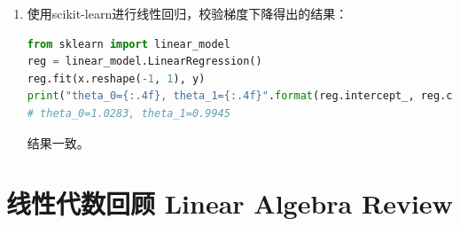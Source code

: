 \documentclass[12pt, a4paper]{article}
\begin{document}
\begin{enumerate}
\begin{align*}
\begin{matrix}
                           \vdots \\
                           y^m
                       \end{matrix}
                   \right]\right)
               \end{align*}
               即：
               \begin{align*}
                   \theta_j&:=\theta_j-\frac{\alpha}{m}\sum_{i=1}^{m}(\theta_0x_0^i+\theta_1x_1^i+\dots-y^i)\cdot x_j^i \\
                   \Rightarrow\Theta&:=\Theta-\frac{\alpha}{m}X^T(X\times \Theta^T-Y)
               \end{align*}
               当只有两个参数$\theta_0,\theta_1$时，由于$\theta_0$对应的是截距项，因此可以对$x$增加全为1的列作为$x_0$，使其可以进行矩阵运算，同时设定学习速率$\alpha$和初始点：
               \begin{lstlisting}[language=Python]
X = np.stack((np.ones(len(x)), x), axis=1)
Y = y
# 设定学习速率
alpha = 0.01
# 设定初始点
theta = np.array([0.0, 0.0])
gradient = alpha / len(y) * (X.T.dot(X.dot(theta.T) - Y))
# 计算代价函数
cost = np.sum(np.power(X.dot(theta.T) - Y, 2)) / (2 * len(y))
costs = [cost]
while not (np.isclose(gradient[0], 0) and np.isclose(gradient[1], 0)):
    theta = theta - gradient
    gradient = alpha / len(y) * (X.T.dot(X.dot(theta.T) - Y))
    cost = np.sum(np.power(X.dot(theta.T) - Y, 2)) / (2 * len(y))
    costs.append(cost)
print("Iteration: {}, theta_0={:.4f}, theta_1={:.4f}".format(len(costs), theta[0], theta[1]))
# Iteration: 4974, theta_0=1.0283, theta_1=0.9945
               \end{lstlisting}
               在迭代4974次后$\theta$变化量约等于0，迭代结束，得到计算出的$\theta$值。
               \item 使用scikit-learn进行线性回归，校验梯度下降得出的结果：
               \begin{lstlisting}[language=Python]
from sklearn import linear_model
reg = linear_model.LinearRegression()
reg.fit(x.reshape(-1, 1), y)
print("theta_0={:.4f}, theta_1={:.4f}".format(reg.intercept_, reg.coef_[0])))
# theta_0=1.0283, theta_1=0.9945
               \end{lstlisting}
               结果一致。
           \end{enumerate}

    \section{线性代数回顾 Linear Algebra Review}
\end{document}
